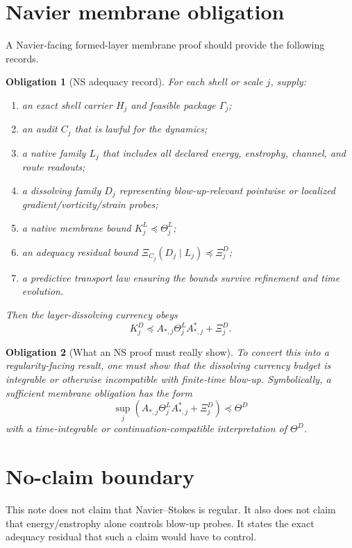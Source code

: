 \documentclass[11pt]{article}
\newtheorem{obligation}{Obligation}
\begin{document}
\section{Navier membrane obligation}
A Navier-facing formed-layer membrane proof should provide the following records.
\begin{obligation}[NS adequacy record]
For each shell or scale $j$, supply:
\begin{enumerate}[label=(\roman*),leftmargin=2em]
\item an exact shell carrier $H_j$ and feasible package $\Gamma_j$;
\item an audit $C_j$ that is lawful for the dynamics;
\item a native family $L_j$ that includes all declared energy, enstrophy, channel, and route readouts;
\item a dissolving family $D_j$ representing blow-up-relevant pointwise or localized gradient/vorticity/strain probes;
\item a native membrane bound $K^L_j\preceq\Theta^L_j$;
\item an adequacy residual bound $\Xi_{C_j}(D_j\mid L_j)\preceq\Xi^D_j$;
\item a predictive transport law ensuring the bounds survive refinement and time evolution.
\end{enumerate}
Then the layer-dissolving currency obeys
\[
K^D_j\preceq A_{*,j}\Theta^L_jA_{*,j}^*+\Xi^D_j.
\]
\end{obligation}

\begin{obligation}[What an NS proof must really show]
To convert this into a regularity-facing result, one must show that the dissolving currency budget is integrable or otherwise incompatible with finite-time blow-up.  Symbolically, a sufficient membrane obligation has the form
\[
\sup_j\left(A_{*,j}\Theta^L_jA_{*,j}^*+\Xi^D_j\right)
\preceq\Theta^D
\]
with a time-integrable or continuation-compatible interpretation of $\Theta^D$.
\end{obligation}

\section{No-claim boundary}
This note does not claim that Navier--Stokes is regular.  It also does not claim that energy/enstrophy alone controls blow-up probes.  It states the exact adequacy residual that such a claim would have to control.
\end{document}
